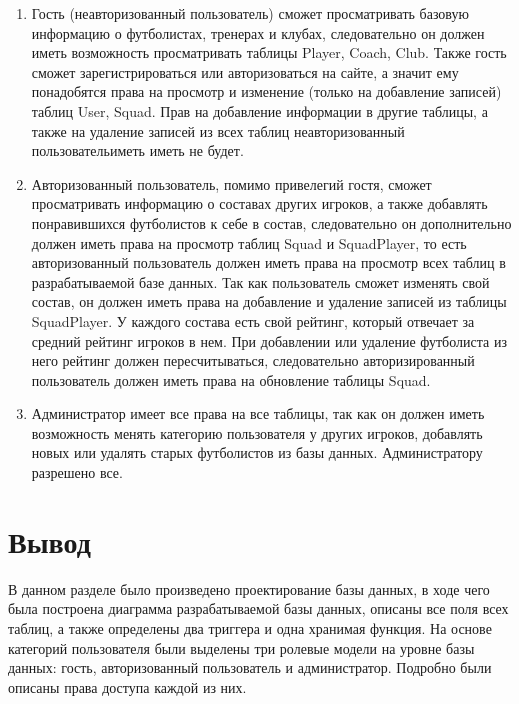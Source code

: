 \begin{enumerate}
    \item Гость (неавторизованный пользователь) сможет просматривать базовую информацию о футболистах, тренерах и клубах, следовательно он должен иметь возможность просматривать таблицы Player, Coach, Club. Также гость сможет зарегистрироваться или авторизоваться на сайте, а значит ему понадобятся права на просмотр и изменение (только на добавление записей) таблиц User, Squad. Прав на добавление информации в другие таблицы, а также на удаление записей из всех таблиц неавторизованный пользовательиметь иметь не будет.
    \item Авторизованный пользователь, помимо привелегий гостя, сможет просматривать информацию о составах других игроков, а также добавлять понравившихся футболистов к себе в состав, следовательно он дополнительно должен иметь права на просмотр таблиц Squad и SquadPlayer, то есть авторизованный пользователь должен иметь права на просмотр всех таблиц в разрабатываемой базе данных. Так как пользователь сможет изменять свой состав, он должен иметь права на добавление и удаление записей из таблицы SquadPlayer. У каждого состава есть свой рейтинг, который отвечает за средний рейтинг игроков в нем. При добавлении или удаление футболиста из него рейтинг должен пересчитываться, следовательно авторизированный пользователь должен иметь права на обновление таблицы Squad.
    \item Администратор имеет все права на все таблицы, так как он должен иметь возможность менять категорию пользователя у других игроков, добавлять новых или удалять старых футболистов из базы данных. Администратору разрешено все.
\end{enumerate}


\section{Вывод}

В данном разделе было произведено проектирование базы данных, в ходе чего была построена диаграмма разрабатываемой базы данных, описаны все поля всех таблиц, а также определены два триггера и одна хранимая функция. На основе категорий пользователя были выделены три ролевые модели на уровне базы данных: гость, авторизованный пользователь и администратор. Подробно были описаны права доступа каждой из них.

